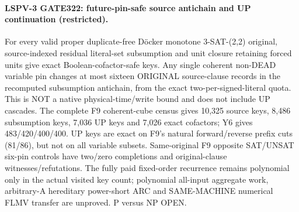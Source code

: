 \paragraph{LSPV-3 GATE322: future-pin-safe source antichain and UP continuation (restricted).}
For every valid proper duplicate-free D\"ocker monotone 3-SAT-(2,2) original, source-indexed residual literal-set subsumption and unit closure retaining forced units give exact Boolean-cofactor-safe keys. Any single coherent non-DEAD variable pin changes at most sixteen ORIGINAL source-clause records in the recomputed subsumption antichain, from the exact two-per-signed-literal quota. This is NOT a native physical-time/write bound and does not include UP cascades. The complete F9 coherent-cube census gives 10,325 source keys, 8,486 subsumption keys, 7,036 UP keys and 7,026 exact cofactors; Y6 gives 483/420/400/400. UP keys are exact on F9's natural forward/reverse prefix cuts (81/86), but not on all variable subsets. Same-original F9 opposite SAT/UNSAT six-pin controls have two/zero completions and original-clause witnesses/refutations. The fully paid fixed-order recurrence remains polynomial only in the actual visited key count; polynomial all-input aggregate work, arbitrary-A hereditary power-short ARC and SAME-MACHINE numerical FLMV transfer are unproved. P versus NP OPEN.
